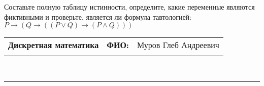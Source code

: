 \documentclass[10pt]{exam}
\newcommand{\class}{Дискретная математика}
\newcommand{\examdate}{}
\begin{document}
\begin{questions}
\begin{enumerate}[a)]
\end{enumerate}\question Составьте полную таблицу истинности, определите, какие переменные являются фиктивными и проверьте, является ли формула тавтологией:
$ P \rightarrow (Q \rightarrow ((P \lor Q) \rightarrow (P \land Q)))$

\end{questions}
\newpage
\begin{flushright}
\begin{tabular}{p{2.8in} r l}
\textbf{\class} & \textbf{ФИО:} &Муров Глеб Андреевич
\\

\textbf{\examdate} &&\\
\end{tabular}\\
\end{flushright}
\rule[1ex]{\textwidth}{.1pt}
\end{document}
